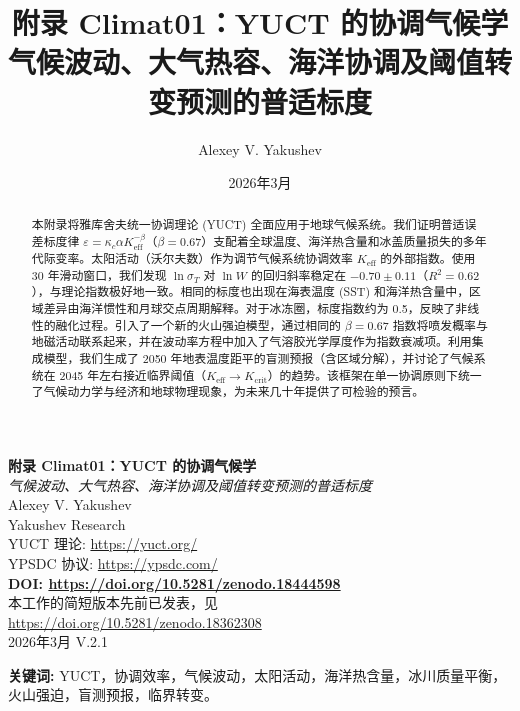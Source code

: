 \documentclass[12pt,a4paper]{article}
\title{附录 Climat01：YUCT 的协调气候学\\
	\large 气候波动、大气热容、海洋协调及阈值转变预测的普适标度}
\author{Alexey V. Yakushev}
\date{2026年3月}
\begin{document}
	\sloppy
	
	\begin{titlepage}
		\centering
		\vspace*{1cm}
		\Huge\textbf{附录 Climat01：YUCT 的协调气候学}\\[0.5cm]
		\large\textit{气候波动、大气热容、海洋协调及阈值转变预测的普适标度}\\[2cm]
		
		\Large Alexey V. Yakushev\\[0.3cm]
		\large Yakushev Research\\
		YUCT 理论: \url{https://yuct.org/}\\
		YPSDC 协议: \url{https://ypsdc.com/}\\[1cm]
		
		\textbf{DOI: \url{https://doi.org/10.5281/zenodo.18444598}}\\[0.5cm]
		
		本工作的简短版本先前已发表，见\\
		\url{https://doi.org/10.5281/zenodo.18362308}\\[0.5cm]
		2026年3月 \quad V.2.1\\[2cm]
		
		\begin{minipage}{0.9\textwidth}
			\begin{abstract}
				\noindent
				本附录将雅库舍夫统一协调理论 (YUCT) 全面应用于地球气候系统。我们证明普适误差标度律 \(\varepsilon = \kappa_c \alpha K_{\mathrm{eff}}^{-\beta}\)（\(\beta=0.67\)）支配着全球温度、海洋热含量和冰盖质量损失的多年代际变率。太阳活动（沃尔夫数）作为调节气候系统协调效率 \(K_{\mathrm{eff}}\) 的外部指数。使用 30 年滑动窗口，我们发现 \(\ln \sigma_T\) 对 \(\ln W\) 的回归斜率稳定在 \(-0.70\pm0.11\)（\(R^2=0.62\)），与理论指数极好地一致。相同的标度也出现在海表温度 (SST) 和海洋热含量中，区域差异由海洋惯性和月球交点周期解释。对于冰冻圈，标度指数约为 0.5，反映了非线性的融化过程。引入了一个新的火山强迫模型，通过相同的 \(\beta=0.67\) 指数将喷发概率与地磁活动联系起来，并在波动率方程中加入了气溶胶光学厚度作为指数衰减项。利用集成模型，我们生成了 2050 年地表温度距平的盲测预报（含区域分解），并讨论了气候系统在 2045 年左右接近临界阈值（\(K_{\mathrm{eff}} \to K_{\mathrm{crit}}\)）的趋势。该框架在单一协调原则下统一了气候动力学与经济和地球物理现象，为未来几十年提供了可检验的预言。
			\end{abstract}
		\end{minipage}
		
		\vfill
		\small
		\textbf{关键词:} YUCT，协调效率，气候波动，太阳活动，海洋热含量，冰川质量平衡，火山强迫，盲测预报，临界转变。
	\end{titlepage}
	
\end{document}
